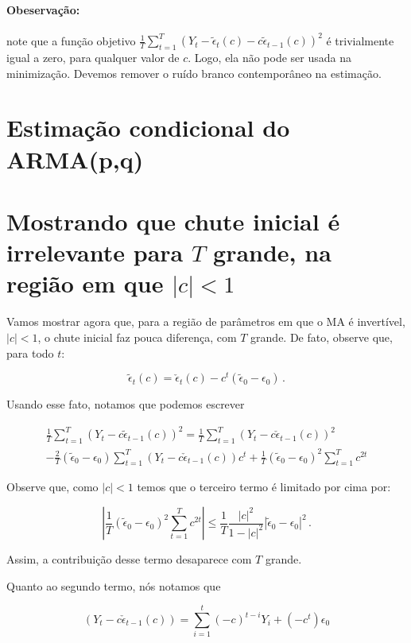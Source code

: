 \documentclass[10pt,a4paper]{article}
\begin{document}
\paragraph{Obeservação:} note que a função objetivo $\frac{1}{T}\sum_{t=1}^T (Y_t - \tilde \epsilon_{t}(c) - c \tilde \epsilon_{t-1}(c))^2$ é trivialmente igual a zero, para qualquer valor de $c$. Logo, ela não pode ser usada na minimização. Devemos remover o ruído branco contemporâneo na estimação.

\section{Estimação condicional do ARMA(p,q)}
\appendix 
\section{Mostrando que chute inicial é irrelevante para $T$ grande, na região em que $|c|<1$}
Vamos mostrar agora que, para a região de parâmetros em que o MA é invertível, $|c|<1$, o chute inicial faz pouca diferença, com $T$ grande. De fato, observe que, para todo $t$:

$$\tilde{\epsilon}_t(c) = \check{\epsilon}_t(c) -c^t(\tilde{\epsilon}_0 - \epsilon_0)\, .$$

Usando esse fato, notamos que podemos escrever

\begin{equation}	
	\begin{aligned}
			\frac{1}{T}\sum_{t=1}^T (Y_t - c \tilde \epsilon_{t-1}(c))^2 = \frac{1}{T}\sum_{t=1}^T (Y_t - c \check \epsilon_{t-1}(c))^2 \\
		- \frac{2}{T}(\tilde{\epsilon}_0 - \epsilon_0)\sum_{t=1}^T(Y_t - c \check{\epsilon}_{t-1}(c))c^t 
		+\frac{1}{T}(\tilde{\epsilon}_0 - \epsilon_0)^2\sum_{t=1}^Tc^{2t}
	\end{aligned}
\end{equation}

Observe que, como $|c|<1$ temos que o terceiro termo é limitado por cima por:

$$\left|\frac{1}{T}(\tilde{\epsilon}_0 - \epsilon_0)^2\sum_{t=1}^Tc^{2t}\right| \leq \frac{1}{T}\frac{|c|^2}{1-|c|^2} |\tilde{\epsilon}_0 - \epsilon_0|^2 \, .$$

Assim, a contribuição desse termo desaparece com $T$ grande.

Quanto ao segundo termo, nós notamos que

$$(Y_t - c \check{\epsilon}_{t-1}(c)) = \sum_{i=1}^{t} (-c)^{t-i} Y_{i} + (-c^{t})\epsilon_0$$
\end{document}
